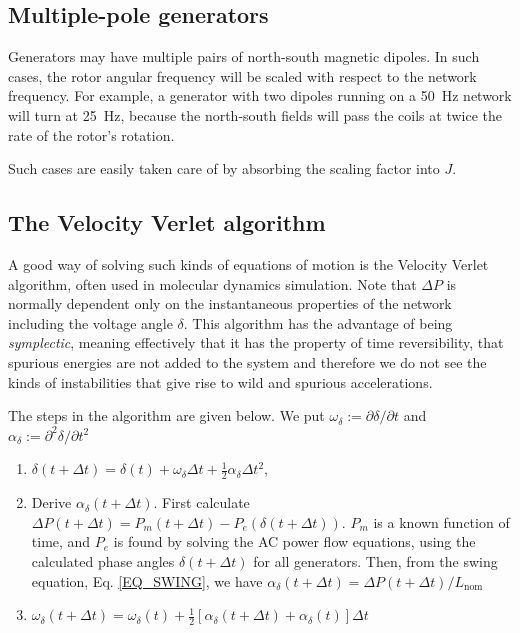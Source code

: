 \documentclass[10pt]{article}
\begin{document}
\subsection{Multiple-pole generators}
Generators may have multiple pairs of north-south magnetic dipoles. In such cases, the rotor angular frequency will be scaled with respect to the network frequency. For example, a generator with two dipoles running on a 50~Hz network will turn at 25~Hz, because the north-south fields will pass the coils at twice the rate of the rotor's rotation.

Such cases are easily taken care of by absorbing the scaling factor into $J$.

\subsection{The Velocity Verlet algorithm}
A good way of solving such kinds of equations of motion is the Velocity Verlet algorithm, often used in molecular dynamics simulation. Note that $\Delta P$ is normally dependent only on the instantaneous properties of the network including the voltage angle $\delta$. This algorithm has the advantage of being \emph{symplectic}, meaning effectively that it has the property of time reversibility, that spurious energies are not added to the system and therefore we do not see the kinds of instabilities that give rise to wild and spurious accelerations.

The steps in the algorithm are given below. We put $\omega_\delta := \partial \delta / \partial t$ and $\alpha_\delta := \partial^2 \delta / \partial t^2$
\begin{enumerate}
	\item $\delta(t + \Delta t) = \delta(t) + \omega_\delta\Delta t + \frac{1}{2}\alpha_\delta\Delta t^2$,
	\item Derive $\alpha_\delta(t + \Delta t)$. First calculate $\Delta P(t + \Delta t) = P_m(t + \Delta t) - P_e(\delta(t + \Delta t))$. $P_m$ is a known function of time, and $P_e$ is found by solving the AC power flow equations, using the calculated phase angles $\delta(t + \Delta t)$ for all generators. Then, from the swing equation, Eq. \ref{EQ_SWING}, we have $\alpha_\delta(t + \Delta t) = \Delta P(t + \Delta t)/L_\text{nom}$
	\item $\omega_\delta(t + \Delta t) = \omega_\delta(t) + \frac{1}{2}\left[\alpha_\delta(t + \Delta t) + \alpha_\delta(t)\right]\Delta t$
\end{enumerate}
\end{document}
